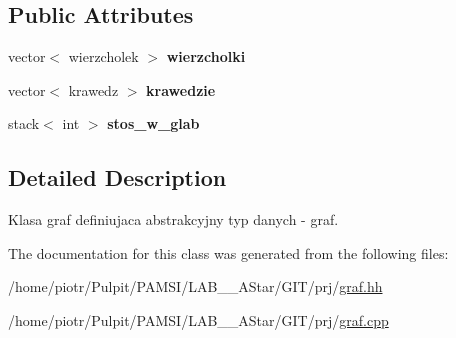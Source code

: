 \subsection*{\-Public \-Attributes}
\begin{DoxyCompactItemize}
\item 
\hypertarget{classgraf_aba9e148b3a8916345e88a7e0874fbe10}{vector$<$ wierzcholek $>$ {\bfseries wierzcholki}}\label{classgraf_aba9e148b3a8916345e88a7e0874fbe10}

\item 
\hypertarget{classgraf_a68ced66086e754b1c9de09c713caf614}{vector$<$ krawedz $>$ {\bfseries krawedzie}}\label{classgraf_a68ced66086e754b1c9de09c713caf614}

\item 
\hypertarget{classgraf_a2fc798089cf872256b0cc86d84c1c43b}{stack$<$ int $>$ {\bfseries stos\-\_\-w\-\_\-glab}}\label{classgraf_a2fc798089cf872256b0cc86d84c1c43b}

\end{DoxyCompactItemize}


\subsection{\-Detailed \-Description}
\-Klasa graf definiujaca abstrakcyjny typ danych -\/ graf. 

\-The documentation for this class was generated from the following files\-:\begin{DoxyCompactItemize}
\item 
/home/piotr/\-Pulpit/\-P\-A\-M\-S\-I/\-L\-A\-B\-\_\-\_\-\-A\-Star/\-G\-I\-T/prj/\hyperlink{graf_8hh}{graf.\-hh}\item 
/home/piotr/\-Pulpit/\-P\-A\-M\-S\-I/\-L\-A\-B\-\_\-\_\-\-A\-Star/\-G\-I\-T/prj/\hyperlink{graf_8cpp}{graf.\-cpp}\end{DoxyCompactItemize}
